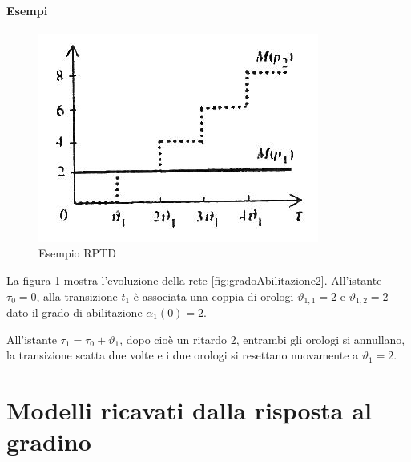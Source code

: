 \documentclass[a4paper]{report}
\begin{document}
\subsubsection{Esempi}
\begin{figure}[!hbp]
  \begin{center}
    \includegraphics[scale=0.5]{./images/petriEsempio01.png}
    \caption{Esempio RPTD}
    \label{fig:petriEsempio01}
  \end{center}
\end{figure}
La figura \ref{fig:petriEsempio01} mostra l'evoluzione della rete
\ref{fig:gradoAbilitazione2}. All'istante $\tau_0 = 0$, alla
transizione $t_1$ \`e associata una coppia di orologi $\vartheta_{1,1}
= 2$ e $\vartheta_{1,2} = 2$ dato il grado di abilitazione
$\alpha_1(0) = 2$.

All'istante $\tau_1 = \tau_0 + \vartheta_1$, dopo cio\`e un ritardo 2,
entrambi gli orologi si annullano, la transizione scatta due volte e i
due orologi si resettano nuovamente a $\vartheta_1 = 2$.

\chapter{Modelli ricavati dalla risposta al gradino}
\end{document}
